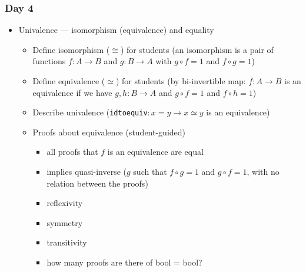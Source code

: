 \documentclass{article}
\begin{document}
\subsubsection*{Day 4}
\begin{itemize}
  \item Univalence --- isomorphism (equivalence) and equality
    \begin{itemize}
      \item Define isomorphism ($\cong$) for students (an isomorphism is a pair of functions $f : A \to B$ and $g : B \to A$ with $g \circ f = 1$ and $f \circ g = 1$)
      \item Define equivalence ($\simeq$) for students (by bi-invertible map: $f : A \to B$ is an equivalence if we have $g, h : B \to A$ and $g \circ f = 1$ and $f \circ h = 1$)
      \item Describe univalence (\texttt{idtoequiv}$ : x = y \to x \simeq y$ is an equivalence)
      \item Proofs about equivalence (student-guided)
      \begin{itemize}
        \item all proofs that $f$ is an equivalence are equal
        \item implies quasi-inverse ($g$ such that $f \circ g = 1$ and $g \circ f = 1$, with no relation between the proofs)
        \item reflexivity
        \item symmetry
        \item transitivity
      \end{itemize}
      \begin{itemize}
        \item how many proofs are there of bool = bool?
      \end{itemize}
    \end{itemize}
\end{itemize}
\end{document}
